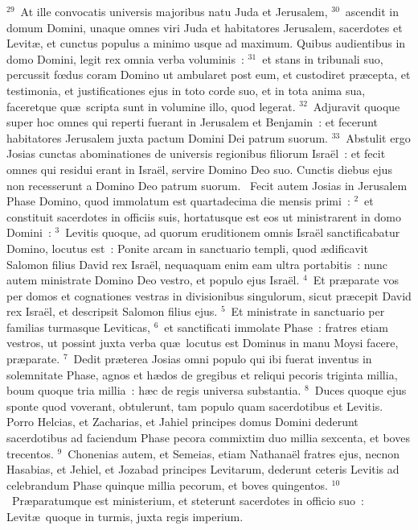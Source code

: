 ${}^{29}$~At ille convocatis universis majoribus natu Juda et Jerusalem,
${}^{30}$~ascendit in domum Domini, unaque omnes viri Juda et habitatores Jerusalem, sacerdotes et Levit\ae , et cunctus populus a minimo usque ad maximum. Quibus audientibus in domo Domini, legit rex omnia verba voluminis~:
${}^{31}$~et stans in tribunali suo, percussit fœdus coram Domino ut ambularet post eum, et custodiret pr\ae cepta, et testimonia, et justificationes ejus in toto corde suo, et in tota anima sua, faceretque qu\ae\ scripta sunt in volumine illo, quod legerat.
${}^{32}$~Adjuravit quoque super hoc omnes qui reperti fuerant in Jerusalem et Benjamin~: et fecerunt habitatores Jerusalem juxta pactum Domini Dei patrum suorum.
${}^{33}$~Abstulit ergo Josias cunctas abominationes de universis regionibus filiorum Isra\"el~: et fecit omnes qui residui erant in Isra\"el, servire Domino Deo suo. Cunctis diebus ejus non recesserunt a Domino Deo patrum suorum.
~Fecit autem Josias in Jerusalem Phase Domino, quod immolatum est quartadecima die mensis primi~:
${}^{2}$~et constituit sacerdotes in officiis suis, hortatusque est eos ut ministrarent in domo Domini~:
${}^{3}$~Levitis quoque, ad quorum eruditionem omnis Isra\"el sanctificabatur Domino, locutus est~: Ponite arcam in sanctuario templi, quod \ae dificavit Salomon filius David rex Isra\"el, nequaquam enim eam ultra portabitis~: nunc autem ministrate Domino Deo vestro, et populo ejus Isra\"el.
${}^{4}$~Et pr\ae parate vos per domos et cognationes vestras in divisionibus singulorum, sicut pr\ae cepit David rex Isra\"el, et descripsit Salomon filius ejus.
${}^{5}$~Et ministrate in sanctuario per familias turmasque Leviticas,
${}^{6}$~et sanctificati immolate Phase~: fratres etiam vestros, ut possint juxta verba qu\ae\ locutus est Dominus in manu Moysi facere, pr\ae parate.
${}^{7}$~Dedit pr\ae terea Josias omni populo qui ibi fuerat inventus in solemnitate Phase, agnos et h\ae dos de gregibus et reliqui pecoris triginta millia, boum quoque tria millia~: h\ae c de regis universa substantia.
${}^{8}$~Duces quoque ejus sponte quod voverant, obtulerunt, tam populo quam sacerdotibus et Levitis. Porro Helcias, et Zacharias, et Jahiel principes domus Domini dederunt sacerdotibus ad faciendum Phase pecora commixtim duo millia sexcenta, et boves trecentos.
${}^{9}$~Chonenias autem, et Semeias, etiam Nathana\"el fratres ejus, necnon Hasabias, et Jehiel, et Jozabad principes Levitarum, dederunt ceteris Levitis ad celebrandum Phase quinque millia pecorum, et boves quingentos.
${}^{10}$~Pr\ae paratumque est ministerium, et steterunt sacerdotes in officio suo~: Levit\ae\ quoque in turmis, juxta regis imperium.
